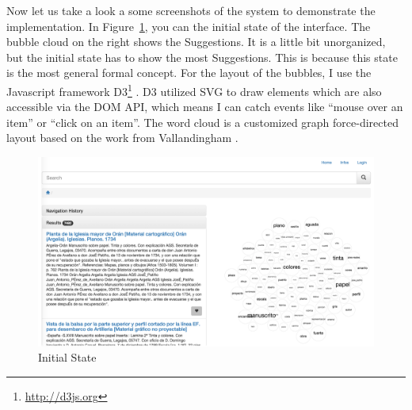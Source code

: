\documentclass[11pt]{report}
\begin{document}
Now let us take a look a some screenshots of the system to demonstrate the implementation. In Figure~\ref{figure:fancy1}, you can the initial state of the interface. The bubble cloud on the right shows the Suggestions. It is a little bit unorganized, but the initial state has to show the most Suggestions. This is because this state is the most general formal concept. For the layout of the bubbles, I use the Javascript framework D3\footnote{\url{http://d3js.org}} \cite{Bostock2011}. D3 utilized SVG to draw elements which are also accessible via the DOM API, which means I can catch events like ``mouse over an item'' or ``click on an item''. The word cloud is a customized graph force-directed layout based on the work from Vallandingham \cite{Vallandingham}. \\

\begin{figure}[!ht]
	\centering
	\includegraphics[width=\linewidth]{images/fancy1}
\caption{Initial State}
\label{figure:fancy1}
\end{figure}
\end{document}
